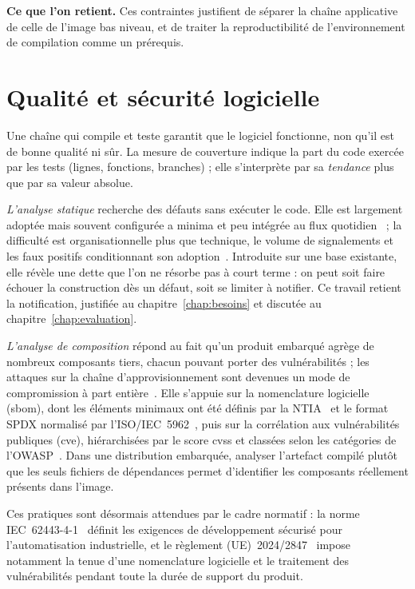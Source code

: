 \textbf{Ce que l'on retient.} Ces contraintes justifient de séparer la chaîne
applicative de celle de l'image bas niveau, et de traiter la reproductibilité de
l'environnement de compilation comme un prérequis.

\section{Qualité et sécurité logicielle}
\label{sec:art-qualite-securite}

Une chaîne qui compile et teste garantit que le logiciel fonctionne, non qu'il
est de bonne qualité ni sûr. La mesure de couverture indique la part du code
exercée par les tests (lignes, fonctions, branches) ; elle s'interprète par sa
\emph{tendance} plus que par sa valeur absolue.

\label{ssec:art-sast}
\emph{L'analyse statique} recherche des défauts sans exécuter le code. Elle est
largement adoptée mais souvent configurée a minima et peu intégrée au flux
quotidien~\cite{beller2016analyzing} ; la difficulté est organisationnelle plus
que technique, le volume de signalements et les faux positifs conditionnant son
adoption~\cite{zampetti2017static}. Introduite sur une base existante, elle révèle
une dette que l'on ne résorbe pas à court terme : on peut soit faire échouer la
construction dès un défaut, soit se limiter à notifier. Ce travail retient la
notification, justifiée au chapitre~\ref{chap:besoins} et discutée au
chapitre~\ref{chap:evaluation}.

\label{sec:art-supply-chain}
\emph{L'analyse de composition} répond au fait qu'un produit embarqué agrège de
nombreux composants tiers, chacun pouvant porter des vulnérabilités ; les
attaques sur la chaîne d'approvisionnement sont devenues un mode de compromission
à part entière~\cite{ohm2020backstabber}. Elle s'appuie sur la nomenclature
logicielle (\gls{sbom}), dont les éléments minimaux ont été définis par la
NTIA~\cite{ntia2021sbom} et le format SPDX normalisé par
l'ISO/IEC~5962~\cite{iso5962}, puis sur la corrélation aux vulnérabilités
publiques (\gls{cve}), hiérarchisées par le score \gls{cvss} et classées selon
les catégories de l'OWASP~\cite{owasptop10}. Dans une distribution embarquée,
analyser l'artefact compilé plutôt que les seuls fichiers de dépendances permet
d'identifier les composants réellement présents dans l'image.

\label{ssec:art-normes}
Ces pratiques sont désormais attendues par le cadre normatif : la norme
IEC~62443-4-1~\cite{iec62443_4_1} définit les exigences de développement sécurisé
pour l'automatisation industrielle, et le règlement (UE)~2024/2847~\cite{cra2024}
impose notamment la tenue d'une nomenclature logicielle et le traitement des
vulnérabilités pendant toute la durée de support du produit.

